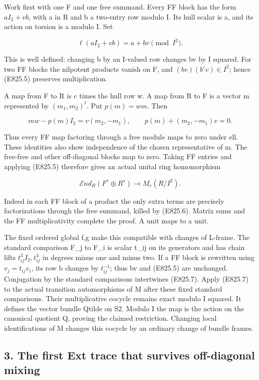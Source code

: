 Work first with one F and one free summand. Every FF block has the form
\(aI_2+vb\), with a in R and b a two-entry row modulo I. Its hull scalar
is a, and its action on torsion is a modulo I. Set

\[
 \ell(aI_2+vb)=a+bv\pmod{I^2}.
 \tag{E825.5}
\]

This is well defined: changing b by an I-valued row changes bv by I
squared. For two FF blocks the nilpotent products vanish on F, and
\((bv)(b'v)\in I^2\); hence (E825.5) preserves multiplication.

A map from F to R is c times the hull row w. A map from R to F is a
vector m represented by \((m_1,m_2)^t\). Put \(p(m)=wm\). Then

\[
 m w-p(m)I_2=v(m_2,-m_1),\qquad
 p(m)+(m_2,-m_1)v=0.
 \tag{E825.6}
\]

Thus every FF map factoring through a free module maps to zero under
ell. These identities also show independence of the chosen
representative of m. The free-free and other off-diagonal blocks map to
zero. Taking FF entries and applying (E825.5) therefore gives an actual
unital ring homomorphism

\[
 \mathcal E nd_R(F^r\oplus R^s)\longrightarrow
       M_r(R/I^2).
 \tag{E825.7}
\]

Indeed in each FF block of a product the only extra terms are precisely
factorizations through the free summand, killed by (E825.6). Matrix sums
and the FF multiplicativity complete the proof. A unit maps to a unit.

The fixed ordered global f,g make this compatible with changes of
L-frame. The standard comparison F\_j to F\_i is scalar t\_ij on its
generators and has chain lifts \(t_{ij}^3I_2,t_{ij}^4\) in degrees minus
one and minus two. If a FF block is rewritten using \(v_j=t_{ij}v_i\),
its row b changes by \(t_{ij}^{-1}\); thus bv and (E825.5) are
unchanged. Conjugation by the standard comparisons intertwines (E825.7).
Apply (E825.7) to the actual transition automorphisms of M after these
fixed standard comparisons. Their multiplicative cocycle remains exact
modulo I squared. It defines the vector bundle Qtilde on S2. Modulo I
the map is the action on the canonical quotient Q, proving the claimed
restriction. Changing local identifications of M changes this cocycle by
an ordinary change of bundle frames.

\subsection{3. The first Ext trace that survives off-diagonal
mixing}\label{SF-E825:the-first-ext-trace-that-survives-off-diagonal-mixing}

